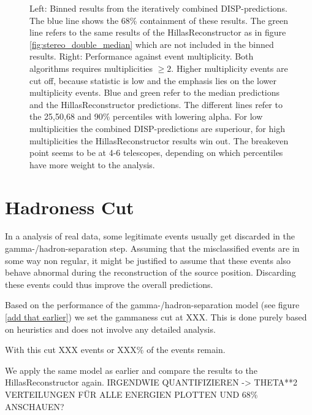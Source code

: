 \begin{figure}
{    Left: Binned results from the iteratively combined DISP-predictions.
    The blue line shows the 
    68\% containment of these results. The green line refers to the 
    same results of the HillasReconstructor as in figure \ref{fig:stereo_double_median} 
    which are not included in the binned results.
    Right: Performance against event multiplicity. Both algorithms requires 
    multiplicities $\geq 2$. Higher multiplicity events are cut off, because 
    statistic is low and the emphasis lies on the lower multiplicity events.
    Blue and green refer to the median predictions and the HillasReconstructor predictions.
    The different lines refer to the 25,50,68 and 90\% percentiles with 
    lowering alpha.
    For low multiplicities the combined DISP-predictions are superiour, 
    for high multiplicities the HillasReconstructor results win out.
    The breakeven point seems to be at 4-6 telescopes, depending on 
    which percentiles have more weight to the analysis.}
    \label{fig:stereo_double_magic}
\end{figure}


\section{Hadroness Cut}

In a analysis of real data, some legitimate events usually get discarded
in the gamma-/hadron-separation step.
Assuming that the misclassified events are in some way non regular, it might be 
justified to assume that these events also behave abnormal during the reconstruction of 
the source position. Discarding these events could thus improve the overall 
predictions.

Based on the performance of the gamma-/hadron-separation model (see figure \ref{add that earlier})
we set the gammaness cut at XXX.
This is done purely based on heuristics and does not involve any detailed analysis.

With this cut XXX events or XXX\% of the events remain.

We apply the same model as earlier and compare the results to the HillasReconstructor
again. IRGENDWIE QUANTIFIZIEREN -> THETA**2 VERTEILUNGEN FÜR ALLE ENERGIEN PLOTTEN UND 68\% ANSCHAUEN?


